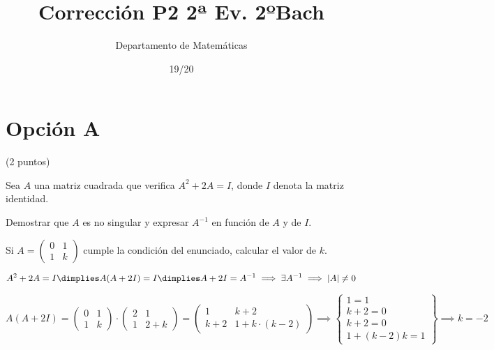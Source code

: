 \documentclass[palatino,nosec,nochap,nobuilddate]{Docencia}
\title{Corrección P2 2ª Ev. 2ºBach}
\author{Departamento de Matemáticas}
\date{19/20}
\newcommand\BackgroundPic{%
\put(0,0){%
\parbox[b][\paperheight]{\paperwidth}{%
\vfill
\centering
\texttt{[image: ../../../../BWLogo.jpeg]}%
\vfill
}}}
\begin{document}
\pagestyle{plain}
\maketitle


\newpage
\section{Opción A}
\begin{problem}(2 puntos)

Sea $A$ una matriz cuadrada que verifica $A^2+2A = I$, donde $I$ denota la matriz identidad.

\ppart Demostrar que $A$ es no singular y expresar $A^{-1}$ en función de $A$ y de $I$.

\ppart Si $A = \begin{pmatrix}0&1\\1&k\end{pmatrix}$ cumple la condición del enunciado, calcular el valor de $k$.

\solution

\spart 
\[A^2+2A = I \dimplies A(A+2I) = I \dimplies A+2I = A^{-1} \implies \exists A^{-1}\implies |A| \neq 0\]


\spart 

\[A(A+2I) = 
\begin{pmatrix}0&1\\1&k\end{pmatrix}·
\begin{pmatrix}2&1\\1&2+k\end{pmatrix} = 
\begin{pmatrix}1&k+2\\k+2&1+k·(k-2)\end{pmatrix}\implies
\left\{
	\begin{array}{c}
		1=1\\
		k+2=0\\
		k+2=0\\
		1+(k-2)k = 1
	\end{array}
\right\}\implies k=-2\]


\end{problem}
\end{document}
